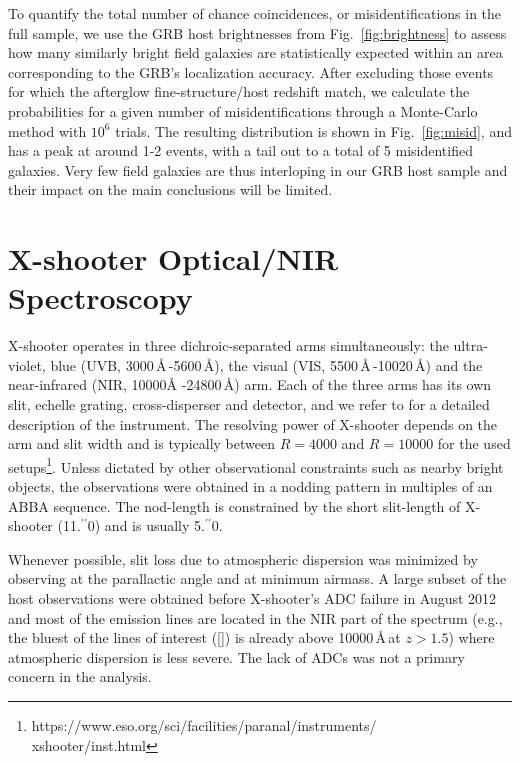 \documentclass[traditabstract, longauth]{aa}
\newcommand{\farc}{\hbox{$.\!\!^{\prime\prime}$}}
\newcommand{\oii}{[\ion{O}{ii}]}
\begin{document}
To quantify the total number of chance coincidences, or misidentifications in the full sample,  {we use the GRB host brightnesses from Fig.~\ref{fig:brightness} to assess how many similarly bright field galaxies \citep{2004AJ....127..180C, 2006ApJS..162....1G} are statistically expected within an area corresponding to the GRB's localization accuracy. After excluding those events for which the afterglow fine-structure/host redshift match, we calculate the probabilities for a given number of misidentifications through a Monte-Carlo method with $10^{6}$ trials. The resulting distribution is shown in Fig.~\ref{fig:misid}, and has a peak at around 1-2 events, with a tail out to a total of 5 misidentified galaxies. Very few field galaxies are thus interloping in our GRB host sample and their impact on the main conclusions will be limited.}

\section{X-shooter Optical/NIR Spectroscopy}
\label{xs}

X-shooter operates in three dichroic-separated arms simultaneously: the ultra-violet, blue (UVB, 3000\,\AA\,-5600\,\AA), the visual (VIS, 5500\,\AA\,-10020\,\AA) and the near-infrared (NIR, 10000\AA\,\,-24800\,\AA) arm. Each of the three arms has its own slit, echelle grating, cross-disperser and detector, and we refer to \citet{2011A&A...536A.105V} for a detailed description of the instrument. The resolving power of X-shooter depends on the arm and slit width and is typically between $R=4000$ and $R=10000$ for the used setups\footnote{https://www.eso.org/sci/facilities/paranal/instruments/\\xshooter/inst.html}. Unless dictated by other observational constraints such as nearby bright objects, the observations were obtained in a nodding pattern in multiples of an ABBA sequence. The nod-length is constrained by the short slit-length of X-shooter (11\farc{0}) and is usually 5\farc{0}. 

Whenever possible, slit loss due to atmospheric dispersion was minimized by observing at the parallactic angle and at minimum airmass. A large subset of the host observations were obtained before X-shooter's ADC failure in August 2012 and most of the emission lines are located in the NIR part of the spectrum (e.g., the bluest of the lines of interest (\oii) is already above 10000\,\AA\,at $z>1.5$) where atmospheric dispersion is less severe. The lack of ADCs was not a primary concern in the analysis.
\end{document}
